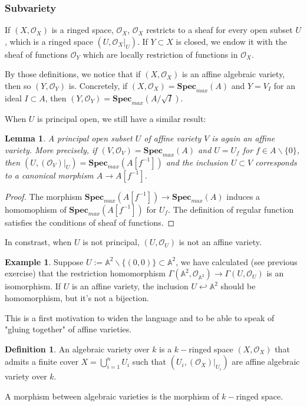 \documentclass[12pt,a4paper,english]{article}
\theoremstyle{plain}
\newtheorem{lem}[thm]{Lemma}
\theoremstyle{definition}
\newtheorem{defi}{Definition}
\newtheorem*{example}{Example}
\theoremstyle{remark}
\newcommand{\spm}{\mathbf{Spec}_{max}}
\begin{document}
\subsubsection{Subvariety}
If $(X,\mathcal{O}_{X})$ is a ringed space, $\mathcal{O}_{X}$, $\mathcal{O}_{X}$ restricts to a sheaf for every open subset $U$, which is a ringed space $(U,\mathcal{O}_{X}|_{U})$. If $Y\subset X$ is closed, we endow it with the sheaf of functions $\mathcal{O}_{Y}$ which are locally restriction of functions in $\mathcal{O}_{X}$. 

By those definitions, we notice that if $(X,\mathcal{O}_{X})$ is an affine algebraic variety, then so $(Y,\mathcal{O}_{Y})$ is. Concretely, if $(X,\mathcal{O}_{X})=\spm(A)$ and $Y=V_{I}$ for an ideal $I\subset A$, then $(Y,\mathcal{O}_{Y})=\spm(A/\sqrt{I})$. 

When $U$ is principal open, we still have a similar result:
\begin{lem}
A principal open subset $U$ of affine variety $V$ is again an affine variety. More precisely, if $(V,\mathcal{O}_{V})=\spm(A)$ and $U=U_{f}$ for $f\in A\backslash\{0\}$, then $(U,(\mathcal{O}_{V})|_{U})=\spm(A[f^{-1}])$ and the inclusion $U\subset V$ corresponds to a canonical morphism  $A\rightarrow A[f^{-1}]$.
\end{lem}
\begin{proof}
The morphism $\spm(A[f^{-1}])\rightarrow\spm(A)$ induces a homomophism of $\spm(A[f^{-1}])$ for $U_{f}$. The definition of regular function satisfies the conditions of sheaf of functions.
\end{proof}
In constrast, when $U$ is not principal, $(U,\mathcal{O}_{U})$ is not an affine variety.

\begin{example}
Suppose $U:=\mathbb{A}^{2}\backslash \{(0,0)\}\subset \mathbb{A}^{2}$, we have calculated (see previous exercise) that the restriction homomorphism $\Gamma(\mathbb{A}^{2},\mathcal{O}_{\mathbb{A}^{2}})\rightarrow \Gamma(U,\mathcal{O}_{U})$ is an isomorphism. If $U$ is an affine variety, the inclusion $U\hookleftarrow \mathbb{A}^{2}$ should be homomorphism, but it's not a bijection.
\end{example}

This is a first motivation to widen the language and to be able to speak of "gluing together" of affine varieties.

\begin{defi}
An algebraic variety over $k$ is a $k-$ringed space $(X,\mathcal{O}_{X})$ that admits a finite cover $X=\bigcup^{n}_{i=1}U_{i}$ such that $(U_{i}, (\mathcal{O}_{X})|_{U_{i}})$ are affine algebraic variety over $k$.

A morphism between algebraic varieties is the morphism of $k-$ringed space.
\end{defi}
\end{document}
